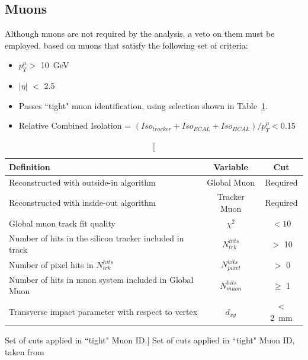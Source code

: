 \subsection{Muons}
Although muons are not required by the analysis, a veto on them must be employed, based on muons that satisfy the following set of criteria:
\begin{itemize}
\item $p^{\mu}_{T} >$ 10~GeV
\item $| \eta|$ $<$ 2.5
\item Passes ``tight" muon identification, using selection shown in Table~\ref{tab:muid}.
\item Relative Combined Isolation = $(Iso_{tracker} + Iso_{ECAL} + Iso_{HCAL}) / p^{\mu}_{T} < $0.15\footnotemark
\end{itemize}

\begin{table}[htbp]
\centering
\begin{tabular}{ m{8.9cm} c c }
\hline
\hline
 \centering Definition & Variable & Cut \\
\hline
\hline
 Reconstructed with outside-in algorithm & Global Muon & Required\\
Reconstructed with inside-out algorithm & Tracker Muon & Required\\
 Global muon track fit quality & $\chi^{2}$ & $< 10$ \\
Number of hits in the silicon tracker included in track & $N^{hits}_{\textit{trk}}$ &$ >$ 10\\
Number of pixel hits in $N^{hits}_{trk}$ & $N^{hits}_{\textit{pixel}}$ & $ > $ 0\\
Number of hits in muon system included in Global Muon & $N^{hits}_{\textit{muon}}$ & $\geq $ 1\\
Transverse impact parameter with respect to vertex & $d_{xy}$ & $< $ 2~mm\\
\hline
\end{tabular}
\caption[Set of cuts applied in ``tight" Muon ID.]{\label{tab:muid} Set of cuts applied in ``tight" Muon ID, taken from \cite{MUO-10-002}}
\end{table}



